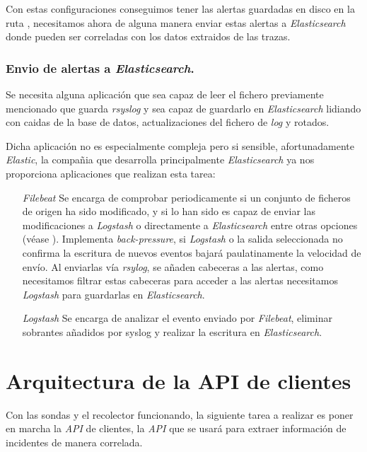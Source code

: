 Con estas configuraciones conseguimos tener las alertas guardadas en disco en la ruta , necesitamos
ahora de alguna manera enviar estas alertas a \emph{Elasticsearch} donde pueden ser correladas con los datos extraidos de las trazas.

\subsubsection{Envio de alertas a \emph{Elasticsearch}.}

Se necesita alguna aplicación que sea capaz de leer el fichero previamente mencionado que guarda \emph{rsyslog} y sea capaz de guardarlo
en \emph{Elasticsearch} lidiando con caidas de la base de datos, actualizaciones del fichero de \emph{log} y rotados.

Dicha aplicación no es especialmente compleja pero si sensible, afortunadamente \emph{Elastic}, la compañia que desarrolla principalmente
\emph{Elasticsearch} ya nos proporciona aplicaciones que realizan esta tarea:

\begin{itemize}
    \item[\emph{Filebeat}] Se encarga de comprobar periodicamente si un conjunto de ficheros de origen ha sido modificado, y si lo han sido
    es capaz de enviar las modificaciones a \emph{Logstash} o directamente a \emph{Elasticsearch} entre otras opciones (véase \cite{elastic-filebeat}). Implementa 
    \emph{back-pressure}, si \emph{Logstash} o la salida seleccionada no confirma la escritura de nuevos eventos bajará paulatinamente la velocidad de envío. 
    Al enviarlas vía \emph{rsylog}, se añaden cabeceras a las alertas, como necesitamos filtrar estas cabeceras para acceder a las alertas necesitamos \emph{Logstash} para 
    guardarlas en \emph{Elasticsearch}.
    \item[\emph{Logstash}] Se encarga de analizar el evento enviado por \emph{Filebeat}, eliminar sobrantes añadidos por syslog y realizar la escritura en
    \emph{Elasticsearch}.
\end{itemize}

\section{Arquitectura de la API de clientes}

Con las sondas y el recolector funcionando, la siguiente tarea a realizar es poner en marcha la \emph{API} de clientes, 
la \emph{API} que se usará para extraer información de incidentes de manera correlada.

